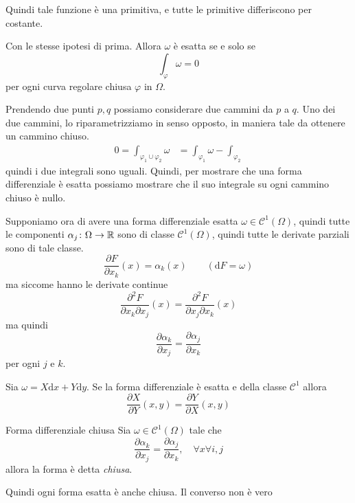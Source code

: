 \documentclass[a4paper]{article}
\begin{document}
Quindi tale funzione è una primitiva, e tutte le primitive differiscono per costante.

\begin{snippetcorollary}{}
    Con le stesse ipotesi di prima. Allora \(\omega\) è esatta se e solo se
    \[
        \int_\varphi \omega = 0
    \]
    per ogni curva regolare chiusa \(\varphi\) in \(\Omega\).
\end{snippetcorollary}

Prendendo due punti \(p, q\) possiamo considerare due cammini da \(p\) a \(q\).
Uno dei due cammini, lo riparametrizziamo in senso opposto, in maniera tale da ottenere
un cammino chiuso.
\begin{align*}
    0 = \int_{\varphi_1 \cup \varphi_2} \omega
    &= \int_{\varphi_1} \omega - \int_{\varphi_2}
\end{align*}
quindi i due integrali sono uguali.
Quindi, per mostrare che una forma differenziale è esatta possiamo
mostrare che il suo integrale su ogni cammino chiuso è nullo.

Supponiamo ora di avere una forma differenziale esatta \(\omega \in \mathcal{C}^1(\Omega)\),
quindi tutte le componenti \(\alpha_j \colon \Omega \to \mathbb{R}\)
sono di classe \(\mathcal{C}^1(\Omega)\), quindi tutte le derivate parziali sono di tale classe.
\[
    \frac{\partial F}{\partial x_k}(x) = \alpha_k(x) \qquad (\text{d}F = \omega)
\]
ma siccome hanno le derivate continue
\[
    \frac{\partial^2 F}{\partial x_k \partial x_j}(x)
    =
    \frac{\partial^2 F}{\partial x_j \partial x_k}(x)
\]
ma quindi
\[
    \frac{\partial \alpha_k}{\partial x_j} =
    \frac{\partial \alpha_j}{\partial x_k}
\]
per ogni \(j\) e \(k\).

\begin{snippetexample}{}
    Sia \(\omega = X\text{d}x + Y\text{d}y\). Se la forma differenziale è esatta e della classe \(\mathcal{C}^1\)
    allora
    \[
        \frac{\partial X}{\partial Y}(x,y)
        = \frac{\partial Y}{\partial X}(x,y)
    \]
\end{snippetexample}

\begin{snippetdefinition}{Forma differenziale chiusa}
    Sia \(\omega \in \mathcal{C}^1(\Omega)\) tale che
    \[
        \frac{\partial \alpha_k}{\partial x_j} =
        \frac{\partial \alpha_j}{\partial x_k}, \quad \forall x\forall i,j
    \]
    allora la forma è detta \emph{chiusa}.
\end{snippetdefinition}

Quindi ogni forma esatta è anche chiusa. Il converso non è vero
\end{document}

